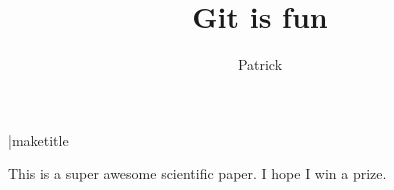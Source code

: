 \documentclass[10pt]{article}
\author{Patrick}
\title{Git is fun}
\begin{document}
        |maketitle

        This is a super awesome scientific paper.
        I hope I win a prize.
\end{document}
